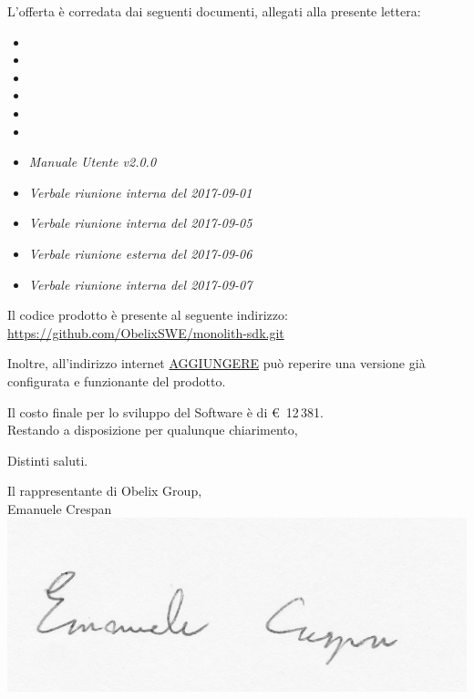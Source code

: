 \documentclass[10 pt,a4paper]{article}
\begin{document}
L'offerta è corredata dai seguenti documenti, allegati alla presente
lettera:
\vspace{.1in}
\begin{itemize}
\item \analisideirequisiti
\item \pianodiprogetto
\item \pianodiqualifica
\item \normediprogetto
\item \gloss
\item {}
\item \emph{Manuale Utente v2.0.0}
\item \emph{Verbale riunione interna del 2017-09-01}
\item \emph{Verbale riunione interna del 2017-09-05}
\item \emph{Verbale riunione esterna del 2017-09-06}
\item \emph{Verbale riunione interna del 2017-09-07}
\end{itemize}

Il codice prodotto è presente al seguente indirizzo: \\
\url{https://github.com/ObelixSWE/monolith-sdk.git}

\clearpage

Inoltre, all'indirizzo internet \url{AGGIUNGERE} può reperire una versione già configurata e funzionante del prodotto. \\


\vspace{.1in}


Il costo finale per lo sviluppo del Software è di \euro  \, 12\,381. \\ 

\vspace{.1in}
Restando a disposizione per qualunque chiarimento,\\

\vspace{.1in}

Distinti saluti.

\vspace{.15in}


\begin{flushright}
Il rappresentante di Obelix Group,\\
Emanuele Crespan\\
\includegraphics[width=.5\textwidth]{../../file_comuni/firme/ec.jpg}
\end{flushright}
\end{document}
